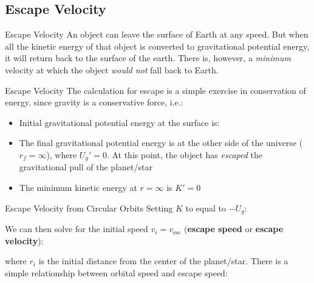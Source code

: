 \documentclass[12pt,compress,aspectratio=169]{beamer}
\begin{document}
\subsection{Escape Velocity}

\begin{frame}{Escape Velocity}
  An object can leave the surface of Earth at any speed. But when all the
  kinetic energy of that object is converted to gravitational potential energy,
  it will return back to the surface of the earth. There is, however, a
  \emph{minimum} velocity at which the object \emph{would not} fall back to
  Earth.
\end{frame}



\begin{frame}{Escape Velocity}
  The calculation for escape is a simple exercise in conservation of energy,
  since gravity is a conservative force, i.e.:

  \begin{itemize}
  \item Initial gravitational potential energy at the surface is:

  \item The final gravitational potential energy is at the other side of the
    universe ($r_f=\infty$), where $U_g'=0$. At this point, the object has
    \emph{escaped} the gravitational pull of the planet/star
  \item The minimum kinetic energy at $r=\infty$ is $K'=0$
  \end{itemize}
\end{frame}



\begin{frame}{Escape Velocity from Circular Orbits}
  Setting $K$ to equal to $-U_g$:


  We can then solve for the initial speed $v_i=v_\text{esc}$
  (\textbf{escape speed} or \textbf{escape velocity}):


  where $r_i$ is the initial distance from the center of the planet/star. There
  is a simple relationship between orbital speed and escape speed:

\end{frame}
\end{document}
